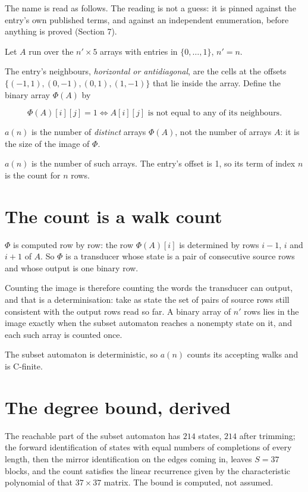 \documentclass[11pt]{article}
\theoremstyle{definition}
\begin{document}
The name is read as follows. The reading is not a guess: it is pinned against the entry's own published terms, and against an independent enumeration, before anything is proved (Section 7).

Let $A$ run over the $n' \times 5$ arrays with entries in $\{0,\dots,1\}$, $n' = n$.

The entry's neighbours, {\itshape horizontal or antidiagonal}, are the cells at the offsets $\{(-1,1), (0,-1), (0,1), (1,-1)\}$ that lie inside the array. Define the binary array $\Phi(A)$ by

\[\Phi(A)[i][j] = 1 \iff A[i][j] \text{ is not equal to any of its neighbours}.\]

$a(n)$ is the number of {\itshape distinct} arrays $\Phi(A)$, not the number of arrays $A$: it is the size of the image of $\Phi$.

$a(n)$ is the number of such arrays. The entry's offset is 1, so its term of index $n$ is the count for $n$ rows.

\section{The count is a walk count}

$\Phi$ is computed row by row: the row $\Phi(A)[i]$ is determined by rows $i-1$, $i$ and $i+1$ of $A$. So $\Phi$ is a transducer whose state is a pair of consecutive source rows and whose output is one binary row.

Counting the image is therefore counting the words the transducer can output, and that is a determinisation: take as state the set of pairs of source rows still consistent with the output rows read so far. A binary array of $n'$ rows lies in the image exactly when the subset automaton reaches a nonempty state on it, and each such array is counted once.

The subset automaton is deterministic, so $a(n)$ counts its accepting walks and is C-finite.

\section{The degree bound, derived}

The reachable part of the subset automaton has $214$ states, $214$ after trimming; the forward identification of states with equal numbers of completions of every length, then the mirror identification on the edges coming in, leaves $S = 37$ blocks, and the count satisfies the linear recurrence given by the characteristic polynomial of that $37\times37$ matrix. The bound is computed, not assumed.
\end{document}
